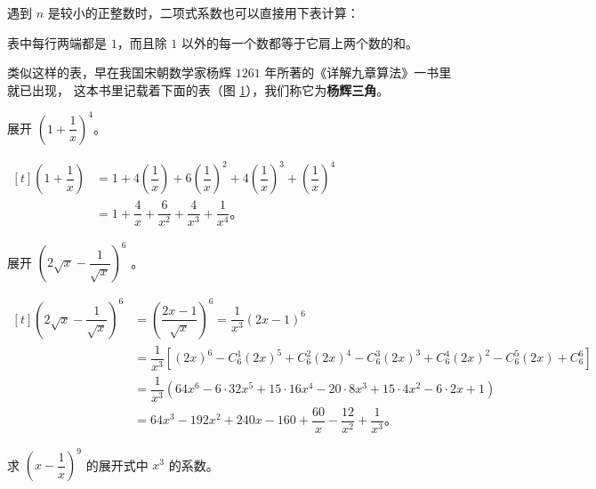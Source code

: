 遇到 $n$ 是较小的正整数时，二项式系数也可以直接用下表计算：

\begin{figure}[htbp]
    \centering
    
\end{figure}

表中每行两端都是 $1$，而且除 $1$ 以外的每一个数都等于它肩上两个数的和。

类似这样的表，早在我国宋朝数学家杨辉 $1261$ 年所著的《详解九章算法》一书里就已出现，
这本书里记载着下面的表（图 \ref{fig:2-8}），我们称它为\textbf{杨辉三角}\footnotemark。

\begin{figure}[htbp]
    \centering
    
    \caption{}\label{fig:2-8}
\end{figure}


\liti 展开 $\left( 1 + \dfrac{1}{x} \right)^4$。

\jie \; $\begin{aligned}[t]
    \left( 1 + \dfrac{1}{x} \right) &= 1 + 4 \left( \dfrac{1}{x} \right) + 6 \left( \dfrac{1}{x} \right)^2 + 4 \left( \dfrac{1}{x} \right)^3 + \left( \dfrac{1}{x} \right)^4 \\
        &= 1 + \dfrac{4}{x} + \dfrac{6}{x^2} + \dfrac{4}{x^3} + \dfrac{1}{x^4} \text{。}
\end{aligned}$



\liti 展开 $\left( 2\sqrt{x} - \dfrac{1}{\sqrt{x}} \right)^6$ 。

\jie \; $\begin{aligned}[t]
    \left( 2\sqrt{x} - \dfrac{1}{\sqrt{x}} \right)^6 &= \left( \dfrac{2x - 1}{\sqrt{x}} \right)^6 = \dfrac{1}{x^3}(2x - 1)^6 \\
        &= \dfrac{1}{x^3} [(2x)^6 - C_6^1 (2x)^5 + C_6^2 (2x)^4 - C_6^3 (2x)^3 + C_6^4 (2x)^2 - C_6^5 (2x) + C_6^6] \\
        &= \dfrac{1}{x^3} (64x^6 - 6 \cdot 32 x^5 + 15 \cdot 16 x^4 - 20 \cdot 8 x^3 + 15 \cdot 4x^2 - 6 \cdot 2x + 1) \\
        &= 64x^3 - 192 x^2 + 240x - 160 + \dfrac{60}{x} - \dfrac{12}{x^2} + \dfrac{1}{x^3} \text{。}
\end{aligned}$



\liti 求 $\left( x - \dfrac{1}{x} \right)^9$ 的展开式中 $x^3$ 的系数。

